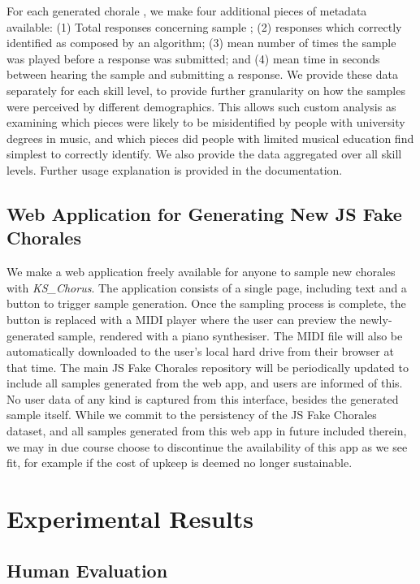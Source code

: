\documentclass{article}
\begin{document}
For each generated chorale , we make four additional pieces of metadata available: (1) Total responses concerning sample ; (2) responses which correctly identified  as composed by an algorithm; (3) mean number of times the sample was played before a response was submitted; and (4) mean time in seconds between hearing the sample and submitting a response. We provide these data separately for each skill level, to provide further granularity on how the samples were perceived by different demographics. This allows such custom analysis as examining which pieces were likely to be misidentified by people with university degrees in music, and which pieces did people with limited musical education find simplest to correctly identify. We also provide the data aggregated over all skill levels. Further usage explanation is provided in the documentation.

\subsection{Web Application for Generating New JS Fake Chorales}\label{subsec:webapp}

We make a web application freely available for anyone to sample new chorales with \textit{KS\_Chorus}. The application consists of a single page, including text and a button to trigger sample generation. Once the sampling process is complete, the button is replaced with a MIDI player where the user can preview the newly-generated sample, rendered with a piano synthesiser. The MIDI file will also be automatically downloaded to the user's local hard drive from their browser at that time. The main JS Fake Chorales repository will be periodically updated to include all samples generated from the web app, and users are informed of this. No user data of any kind is captured from this interface, besides the generated sample itself. While we commit to the persistency of the JS Fake Chorales dataset, and all samples generated from this web app in future included therein, we may in due course choose to discontinue the availability of this app as we see fit, for example if the cost of upkeep is deemed no longer sustainable.

\section{Experimental Results}\label{sec:results}

\subsection{Human Evaluation}\label{subsec:humaneval}
\end{document}
